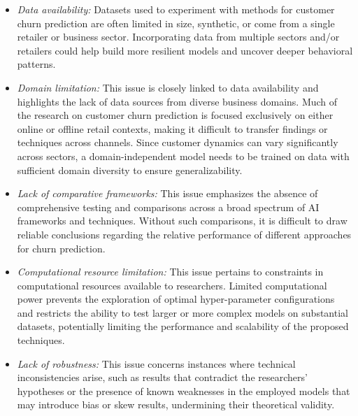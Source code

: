 \begin{itemize}
    \item \textit{Data availability:} Datasets used to experiment with methods for customer churn prediction are often limited in size, synthetic, or come from a single retailer or business sector. Incorporating data from multiple sectors and/or retailers could help build more resilient models and uncover deeper behavioral patterns.

    \item \textit{Domain limitation:} This issue is closely linked to data availability and highlights the lack of data sources from diverse business domains. Much of the research on customer churn prediction is focused exclusively on either online or offline retail contexts, making it difficult to transfer findings or techniques across channels. Since customer dynamics can vary significantly across sectors, a domain-independent model needs to be trained on data with sufficient domain diversity to ensure generalizability.

    \item \textit{Lack of comparative frameworks:} This issue emphasizes the absence of comprehensive testing and comparisons across a broad spectrum of AI frameworks and techniques. Without such comparisons, it is difficult to draw reliable conclusions regarding the relative performance of different approaches for churn prediction.

    \item \textit{Computational resource limitation:} This issue pertains to constraints in computational resources available to researchers. Limited computational power prevents the exploration of optimal hyper-parameter configurations and restricts the ability to test larger or more complex models on substantial datasets, potentially limiting the performance and scalability of the proposed techniques.

    \item \textit{Lack of robustness:} This issue concerns instances where technical inconsistencies arise, such as results that contradict the researchers’ hypotheses or the presence of known weaknesses in the employed models that may introduce bias or skew results, undermining their theoretical validity.
\end{itemize}



